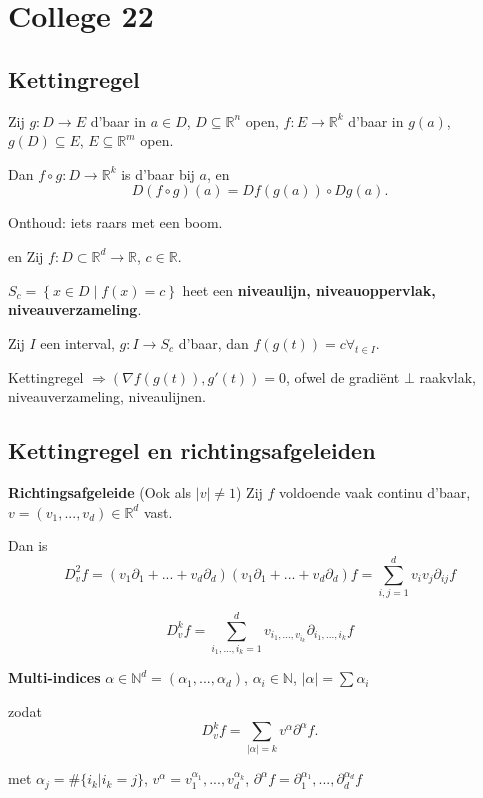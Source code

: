 \documentclass[a4paper]{exam}
\theoremstyle{definition}
\newcommand{\naturals}{\mathbb{N}}
\newcommand{\reals}{\mathbb{R}}
\begin{document}
			\newpage
		\section{College 22}
		\subsection{Kettingregel}
			\theorem Zij $g:D \to E$ d'baar in $a \in D$, $D \subseteq \reals^n$ open, $f:E \to \reals^k$ d'baar in $g(a)$, $g(D) \subseteq E$, $E \subseteq \reals^m$ open.
			
			Dan $f\circ g:D\to \reals^k$ is d'baar bij $a$, en \[ D(f \circ g)(a) = Df(g(a))\circ Dg(a). \]
			
			Onthoud: iets raars met een boom.
			
			\gevolg en  Zij $f:D \subset \reals^d \to \reals$, $c \in \reals$. 
			
			$S_c = \left\{ x\in D \middle| f(x)=c \right\}$ heet een \textbf{niveaulijn, niveauoppervlak, niveauverzameling}.
			
			Zij $I$ een interval, $g: I\to S_c$ d'baar, dan $f(g(t))=c \forall_{t \in I}$.
			
			\opm Kettingregel $\Rightarrow (\nabla f(g(t)),g'(t)) = 0$, ofwel de gradi\"ent $\bot$ raakvlak, niveauverzameling, niveaulijnen.
			
		\subsection{Kettingregel en richtingsafgeleiden}
			
			 \textbf{Richtingsafgeleide} (Ook als $|v|\neq 1$)
			Zij $f$ voldoende vaak continu d'baar, $v=(v_1,...,v_d) \in \reals^d$ vast.
			
			Dan is \[ D_v^2 f = (v_1 \partial_1 + ... + v_d \partial_d)(v_1 \partial_1 + ... + v_d \partial_d)f = \sum_{i,j=1}^{d} v_i v_j \partial_{ij}f \]
			
			\[ D_v^k f = \sum_{i_1,...,i_k=1}^{d} v_{{i_1},...,v_{i_k}} \partial_{i_1,...,i_k} f \]
			
			\nota \textbf{Multi-indices} $ \alpha \in \naturals^d = (\alpha_1 ,..., \alpha_d) $, $\alpha_i \in \naturals$, $ |\alpha| = \sum \alpha_i $
			
			zodat \[ D_v^k f = \sum_{|\alpha|=k} v^\alpha \partial^\alpha f. \]
			
			met $ \alpha_j = \#\{i_k | i_k = j\} $, $ v^\alpha = v_1^{\alpha_1} ,..., v_d^{\alpha_k} $, $ \partial^\alpha f = \partial_1^{\alpha_1},...,\partial_d^{\alpha_d} f $
			
\end{document}
